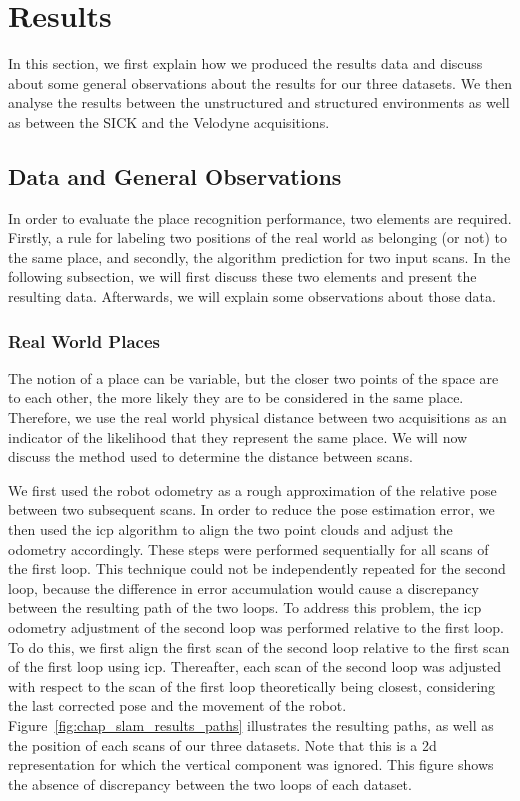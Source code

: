 \section{Results}
\label{sec:chap_slam_results}

In this section, we first explain how we produced the results data and discuss about some general observations about the results for our three datasets. We then analyse the results between the unstructured and structured environments as well as between the SICK and the Velodyne acquisitions. 

\subsection{Data and General Observations}
\label{ssec:chap_slam_performance_evaluation}

In order to evaluate the place recognition performance, two elements are required. Firstly, a rule for labeling two positions of the real world as belonging (or not) to the same place, and secondly, the algorithm prediction for two input scans. In the following subsection, we will first discuss these two elements and present the resulting data. Afterwards, we will explain some observations about those data.


\subsubsection{Real World Places}
The notion of a place can be variable, but the closer two points of the space are to each other, the more likely they are to be considered in the same place. Therefore, we use the real world physical distance between two acquisitions as an indicator of the likelihood that they represent the same place. We will now discuss the method used to determine the distance between scans. 

We first used the robot odometry as a rough approximation of the relative pose between two subsequent scans. In order to reduce the pose estimation error, we then used the \gls*{icp} algorithm to align the two point clouds and adjust the odometry accordingly. These steps were performed sequentially for all scans of the first loop. This technique could not be independently repeated for the second loop, because the difference in error accumulation would cause a discrepancy between the resulting path of the two loops. To address this problem, the \gls*{icp} odometry adjustment of the second loop was performed relative to the first loop. To do this, we first align the first scan of the second loop relative to the first scan of the first loop using \gls*{icp}. Thereafter, each scan of the second loop was adjusted with respect to the scan of the first loop theoretically being closest, considering the last corrected pose and the movement of the robot. Figure~\ref{fig:chap_slam_results_paths} illustrates the resulting paths, as well as the position of each scans of our three datasets. Note that this is a \gls*{2d} representation for which the vertical component was ignored. This figure shows the absence of discrepancy between the two loops of each dataset.

